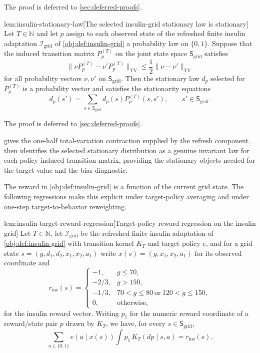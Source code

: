 \documentclass[11pt]{article}
\begin{document}
The proof is deferred to \cref{sec:deferred-proofs}.

\begin{lemmav}{lem:insulin-stationary-law}[The selected insulin-grid stationary law is stationary]
Let \(T\in\mathbb N\) and let \(p\) assign to each observed state of the refreshed finite insulin adaptation \(\mathcal I_{\mathrm{grid}}\) of \cref{obj:def:insulin-grid} a probability law on \(\{0,1\}\). Suppose that the induced transition matrix \(P_p^{(T)}\) on the joint state space \(\mathsf S_{\mathrm{grid}}\) satisfies
\[
\|\nu P_p^{(T)}-\nu'P_p^{(T)}\|_{\mathrm{TV}}\le\frac12\|\nu-\nu'\|_{\mathrm{TV}}
\]
for all probability vectors \(\nu,\nu'\) on \(\mathsf S_{\mathrm{grid}}\). Then the stationary law \(d_p\) selected for \(P_p^{(T)}\) is a probability vector and satisfies the stationarity equations
\[
d_p(s')=\sum_{s\in\mathsf S_{\mathrm{grid}}}d_p(s)P_p^{(T)}(s,s'),
\qquad s'\in\mathsf S_{\mathrm{grid}} .
\]
\end{lemmav}

The proof is deferred to \cref{sec:deferred-proofs}.

 gives the one-half total-variation contraction supplied by the refresh component.  then identifies the selected stationary distribution as a genuine invariant law for each policy-induced transition matrix, providing the stationary objects needed for the target value and the bias diagnostic.

The reward in \cref{obj:def:insulin-grid} is a function of the current grid state. The following regressions make this explicit under target-policy averaging and under one-step target-to-behavior reweighting.

\begin{lemmav}{lem:insulin-target-reward-regression}[Target-policy reward regression on the insulin grid]
Let \(T\in\mathbb N\), let \(\mathcal I_{\mathrm{grid}}\) be the refreshed finite insulin adaptation of \cref{obj:def:insulin-grid} with transition kernel \(K_T\) and target policy \(e\), and for a grid state \(s=(g,d_1,d_2,x_1,x_2,a_1)\) write \(x(s)=(g,x_1,x_2,a_1)\) for its observed coordinate and
\[
r_{\mathrm{ins}}(s)=
\begin{cases}
-1,&g\le70,\\
-2/3,&g>150,\\
-1/3,&70<g\le80\ \text{or}\ 120<g\le150,\\
0,&\text{otherwise},
\end{cases}
\]
for the insulin reward vector. Writing \(p_1\) for the numeric reward coordinate of a reward/state pair \(p\) drawn by \(K_T\), we have, for every \(s\in\mathsf S_{\mathrm{grid}}\),
\[
\sum_{a\in\{0,1\}}e(a\mid x(s))\int p_1\,K_T(dp\mid s,a)
=
r_{\mathrm{ins}}(s) .
\]
\end{lemmav}
\end{document}
